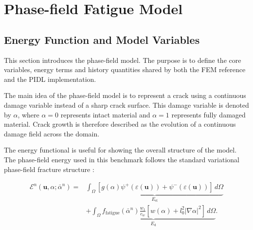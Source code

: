 \section{Phase-field Fatigue Model}
\label{sec:c3_reference_phase_field}

\subsection{Energy Function and Model Variables}
This section introduces the phase-field model. The purpose is to define the core variables, energy terms and history quantities shared by both the FEM reference and the PIDL implementation.

The main idea of the phase-field model is to represent a crack using a continuous damage variable instead of a sharp crack surface. This damage variable is denoted by $\alpha$, where $\alpha=0$ represents intact material and $\alpha=1$ represents fully damaged material. Crack growth is therefore described as the evolution of a continuous damage field across the domain.

The energy functional is useful for showing the overall structure of the model. The phase-field energy used in this benchmark follows the standard variational phase-field fracture structure \citep{Francfort1998jmps,Bourdin2000jmps,Miehe2010cmame,Carrara2020cmame}:

\begin{equation}
    \begin{aligned}
    \mathcal{E}^{n}
    \left(
    \mathbf{u},\alpha;
    \bar{\alpha}^{n}
    \right)
    =
    &\underbrace{
    \int_{\Omega}
    \left[
    g(\alpha)\psi^{+}(\varepsilon(\mathbf{u}))
    +
    \psi^{-}(\varepsilon(\mathbf{u}))
    \right]\,d\Omega
    }_{E_{\mathrm{el}}}
    \\
    &+
    \underbrace{
    \int_{\Omega}
    f_{\mathrm{fatigue}}(\bar{\alpha}^{n})
    \frac{w_1}{c_w}
    \left[
    w(\alpha)
    +
    l_0^2|\nabla\alpha|^2
    \right]\,d\Omega
    }_{E_{\mathrm{d}}}.
    \end{aligned}
    \label{eq:c3_fatigue_phase_field_energy}
\end{equation}

